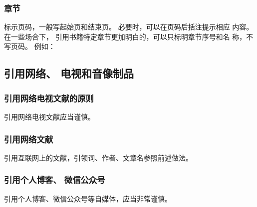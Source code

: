 \documentclass{article}
\begin{document}
\begin{quotation}





\end{quotation}


\subsubsection{章节}
标示页码，一般写起始页和结束页。 必要时，可以在页码后括注提示相应
内容。
在一些场合下， 引用书籍特定章节更加明白的，可以只标明章节序号和名
称，不写页码。
例如：

\begin{quotation}
\end{quotation}

\subsection{引用网络、 电视和音像制品}

\subsubsection{引用网络电视文献的原则}
引用网络电视文献应当谨慎。

\subsubsection{引用网络文献}
引用互联网上的文献，引领词、作者、文章名参照前述做法。
\begin{quotation}


\end{quotation}


\subsubsection{引用个人博客、 微信公众号}
引用个人博客、微信公众号等自媒体，应当非常谨慎。
\end{document}
